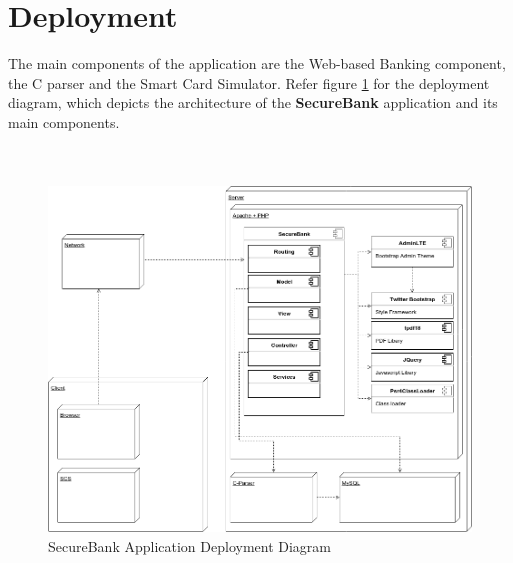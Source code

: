 \section{Deployment}

The main components of the application are the Web-based Banking component, the C parser and the Smart Card Simulator.
Refer figure \ref{fig:deployment} for the deployment diagram, which depicts the architecture of the \textbf{SecureBank} application and its main components. \\ \\ \\

\begin{figure}[ht]
	\centering
	\includegraphics[width=.8\linewidth]{figures/deployment.png}
	\caption{SecureBank Application Deployment Diagram}
	\label{fig:deployment}
\end{figure}

\clearpage
